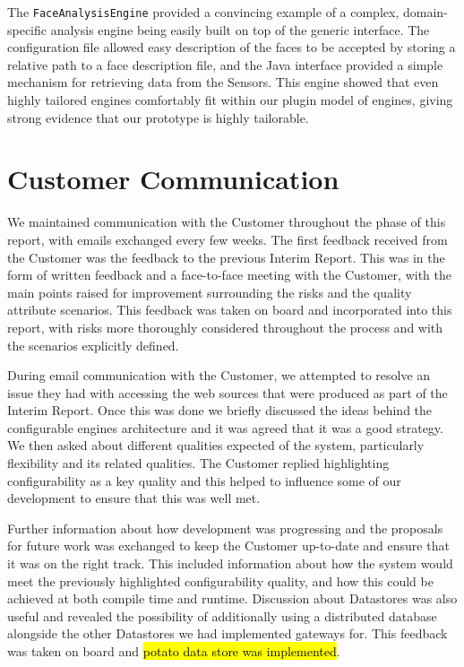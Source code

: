 \documentclass[10pt,a4paper]{article}
\begin{document}
The \texttt{FaceAnalysisEngine} provided a convincing example of a complex, domain-specific analysis engine being easily built on top of the generic interface. The configuration file allowed easy description of the faces to be accepted by storing a relative path to a face description file, and the Java interface provided a simple mechanism for retrieving data from the Sensors. This engine showed that even highly tailored engines comfortably fit within our plugin model of engines, giving strong evidence that our prototype is highly tailorable.


\section{Customer Communication}
\label{sec:customer_comms}

We maintained communication with the Customer throughout the phase of this report, with emails exchanged every few weeks. The first feedback received from the Customer was the feedback to the previous Interim Report. This was in the form of written feedback and a face-to-face meeting with the Customer, with the main points raised for improvement surrounding the risks and the quality attribute scenarios. This feedback was taken on board and incorporated into this report, with risks more thoroughly considered throughout the process and with the scenarios explicitly defined.

During email communication with the Customer, we attempted to resolve an issue they had with accessing the web sources that were produced as part of the Interim Report. Once this was done we briefly discussed the ideas behind the configurable engines architecture and it was agreed that it was a good strategy. We then asked about different qualities expected of the system, particularly flexibility and its related qualities. The Customer replied highlighting configurability as a key quality and this helped to influence some of our development to ensure that this was well met.

Further information about how development was progressing and the proposals for future work was exchanged to keep the Customer up-to-date and ensure that it was on the right track. This included information about how the system would meet the previously highlighted configurability quality, and how this could be achieved at both compile time and runtime. Discussion about Datastores was also useful and revealed the possibility of additionally using a distributed database alongside the other Datastores we had implemented gateways for. This feedback was taken on board and \hl{potato data store was implemented}.
\end{document}
